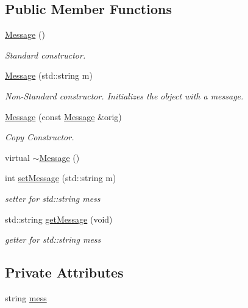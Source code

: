 \subsection*{Public Member Functions}
\begin{DoxyCompactItemize}
\mbox{\hyperlink{classMessage_a4fc4f717b634e66070366cb7722d7761}{Message}} ()
\begin{DoxyCompactList}\small\item\em Standard constructor. \end{DoxyCompactList}\item 
\mbox{\hyperlink{classMessage_ad8d8236fe10ad63103a26f84c68bcea6}{Message}} (std\+::string m)
\begin{DoxyCompactList}\small\item\em Non-\/\+Standard constructor. Initializes the object with a message. \end{DoxyCompactList}\item 
\mbox{\hyperlink{classMessage_afc0cbea76e5ed74d86af6b6646fd8642}{Message}} (const \mbox{\hyperlink{classMessage}{Message}} \&orig)
\begin{DoxyCompactList}\small\item\em Copy Constructor. \end{DoxyCompactList}\item 
virtual \mbox{\hyperlink{classMessage_a3f7275462831f787a861271687bcad67}{$\sim$\+Message}} ()
\item 
int \mbox{\hyperlink{classMessage_aa1e4c60f94308a9367ad3106c34b28f3}{set\+Message}} (std\+::string m)
\begin{DoxyCompactList}\small\item\em setter for std\+::string mess \end{DoxyCompactList}\item 
std\+::string \mbox{\hyperlink{classMessage_a8d2e67a8732ecaeca309df6ac5dda156}{get\+Message}} (void)
\begin{DoxyCompactList}\small\item\em getter for std\+::string mess \end{DoxyCompactList}\end{DoxyCompactItemize}
\subsection*{Private Attributes}
\begin{DoxyCompactItemize}
\item 
string \mbox{\hyperlink{classMessage_a71af4fd1655feab5f4986782f9c1bc92}{mess}}
\end{DoxyCompactItemize}


